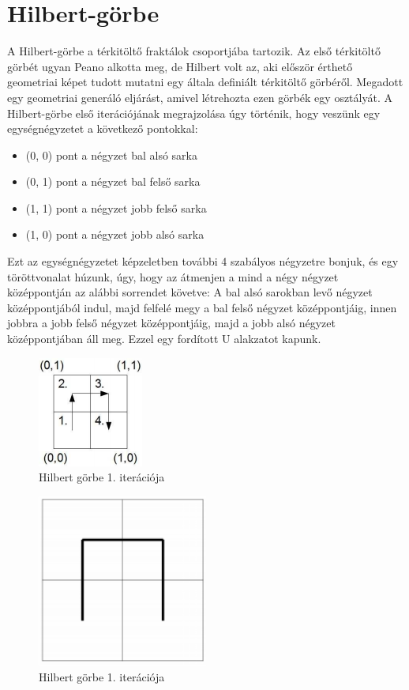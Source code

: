 \section*{Hilbert-görbe}
A Hilbert-görbe a térkitöltő fraktálok csoportjába tartozik. Az első térkitöltő görbét ugyan Peano alkotta meg, de Hilbert volt az, aki először érthető geometriai képet tudott mutatni egy általa definiált térkitöltő görbéről. Megadott egy geometriai generáló eljárást, amivel létrehozta ezen görbék egy osztályát. A Hilbert-görbe első iterációjának megrajzolása úgy történik, hogy veszünk egy egységnégyzetet a következő pontokkal:
\begin{itemize}
	\item (0, 0) pont a négyzet bal alsó sarka
	\item (0, 1) pont a négyzet bal felső sarka
	\item (1, 1) pont a négyzet jobb felső sarka
	\item (1, 0) pont a négyzet jobb alsó sarka
\end{itemize}
Ezt az egységnégyzetet képzeletben további 4 szabályos négyzetre bonjuk, és egy töröttvonalat húzunk, úgy, hogy az átmenjen a mind a négy négyzet középpontján az alábbi sorrendet követve: A bal alsó sarokban levő négyzet középpontjából indul, majd felfelé megy a bal felső négyzet középpontjáig, innen jobbra a jobb felső négyzet középpontjáig, majd a jobb alsó négyzet középpontjában áll meg. Ezzel egy fordított U alakzatot kapunk. 
\begin{figure}[!ht]
	\begin{center}
		\includegraphics{img/HilbertCurve1-1}
		\caption[labelInTOC]{Hilbert görbe 1. iterációja}
	\end{center}
\end{figure}
\begin{figure}[!ht]
	\begin{center}
		\includegraphics[width=0.5\textwidth]{img/HilbertCurve1-2}
		\caption[labelInTOC]{Hilbert görbe 1. iterációja}
	\end{center}
\end{figure}
